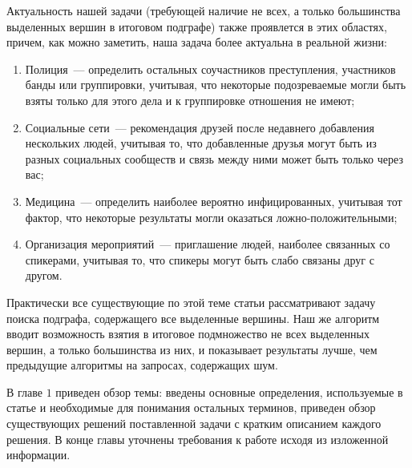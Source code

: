 Актуальность нашей задачи (требующей наличие не всех, а только большинства выделенных вершин в итоговом подграфе) также проявлется в этих областях, причем, как можно заметить, наша задача более актуальна в реальной жизни:

\begin{enumerate}
  \item Полиция~--- определить остальных соучастников преступления, участников банды или группировки, учитывая, что некоторые подозреваемые могли быть взяты только для этого дела и к группировке отношения не имеют;
  \item Социальные сети~--- рекомендация друзей после недавнего добавления нескольких людей, учитывая то, что добавленные друзья могут быть из разных социальных сообществ и связь между ними может быть только через вас;
  \item Медицина~--- определить наиболее вероятно инфицированных, учитывая тот фактор, что некоторые результаты могли оказаться ложно-положительными;
  \item Организация мероприятий~--- приглашение людей, наиболее связанных со спикерами, учитывая то, что спикеры могут быть слабо связаны друг с другом.
\end{enumerate}




Практически все существующие по этой теме статьи рассматривают задачу поиска подграфа, содержащего все выделенные вершины. Наш же алгоритм вводит возможность взятия в итоговое подмножество не всех выделенных вершин, а только большинства из них, и показывает результаты лучше, чем предыдущие алгоритмы на запросах, содержащих шум.


В главе $1$ приведен обзор темы: введены основные определения, используемые в статье и необходимые для понимания остальных терминов, приведен обзор существующих решений поставленной задачи с кратким описанием каждого решения. В конце главы уточнены требования к работе исходя из изложенной информации.

